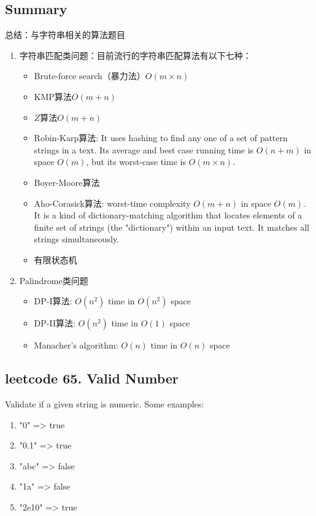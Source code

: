 \documentclass[a4paper,10pt]{article}
\begin{document}
\subsection{Summary}
\begin{CJK*}{UTF8}{gbsn}
\noindent 总结：与字符串相关的算法题目
\begin{enumerate}
    \item 字符串匹配类问题：目前流行的字符串匹配算法有以下七种：
        \begin{itemize}
            \item Brute-force search（暴力法）$O(m \times n)$
            \item KMP算法$O(m+n)$
            \item $Z$算法$O(m+n)$
            \item Robin-Karp算法: It uses hashing to find any one of a set of pattern strings in a text. Its average and best case running time is $O(n+m)$ in space $O(m)$, but its worst-case time is $O(m \times n)$.
            \item Boyer-Moore算法
            \item Aho-Corasick算法: worst-time complexity $O(m+n)$ in space $O(m)$. It is a kind of dictionary-matching algorithm that locates elements of a finite set of strings (the "dictionary") within an input text. It matches all strings simultaneously.
            \item 有限状态机
        \end{itemize}
    
    \item Palindrome类问题
        \begin{itemize}
            \item DP-I算法: $O(n^2)$ time in $O(n^2)$ space
            \item DP-II算法: $O(n^2)$ time in $O(1)$ space
            \item Manacher's algorithm: $O(n)$ time in $O(n)$ space
        \end{itemize}
\end{enumerate}
\end{CJK*}


\subsection{leetcode 65. Valid Number}
Validate if a given string is numeric. Some examples:
\begin{enumerate}
    \item "0" => true
    \item "0.1" => true
    \item "abc" => false
    \item "1a" => false
    \item "2e10" => true
\end{enumerate}
\end{document}
